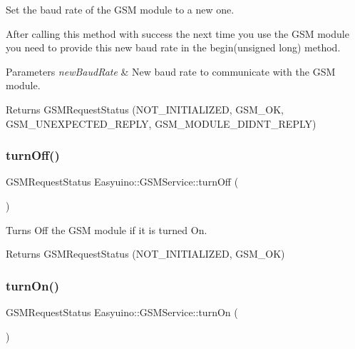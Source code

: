 Set the baud rate of the G\+SM module to a new one. 

After calling this method with success the next time you use the G\+SM module you need to provide this new baud rate in the begin(unsigned long) method. 
\begin{DoxyParams}{Parameters}
{\em new\+Baud\+Rate} & New baud rate to communicate with the G\+SM module. \\
\hline
\end{DoxyParams}
\begin{DoxyReturn}{Returns}
G\+S\+M\+Request\+Status (N\+O\+T\+\_\+\+I\+N\+I\+T\+I\+A\+L\+I\+Z\+ED, G\+S\+M\+\_\+\+OK, G\+S\+M\+\_\+\+U\+N\+E\+X\+P\+E\+C\+T\+E\+D\+\_\+\+R\+E\+P\+LY, G\+S\+M\+\_\+\+M\+O\+D\+U\+L\+E\+\_\+\+D\+I\+D\+N\+T\+\_\+\+R\+E\+P\+LY) 
\end{DoxyReturn}
\mbox{\label{class_easyuino_1_1_g_s_m_service_a327c2610c2aa7ba5a54530d87a0d6128}} 
\subsubsection{\texorpdfstring{turn\+Off()}{turnOff()}}
{\footnotesize\ttfamily G\+S\+M\+Request\+Status Easyuino\+::\+G\+S\+M\+Service\+::turn\+Off (\begin{DoxyParamCaption}{ }\end{DoxyParamCaption})}



Turns Off the G\+SM module if it is turned On. 

\begin{DoxyReturn}{Returns}
G\+S\+M\+Request\+Status (N\+O\+T\+\_\+\+I\+N\+I\+T\+I\+A\+L\+I\+Z\+ED, G\+S\+M\+\_\+\+OK) 
\end{DoxyReturn}
\mbox{\label{class_easyuino_1_1_g_s_m_service_ad5bd54c7dfcc402df0fac92c88e07c6e}} 
\subsubsection{\texorpdfstring{turn\+On()}{turnOn()}}
{\footnotesize\ttfamily G\+S\+M\+Request\+Status Easyuino\+::\+G\+S\+M\+Service\+::turn\+On (\begin{DoxyParamCaption}{ }\end{DoxyParamCaption})}



